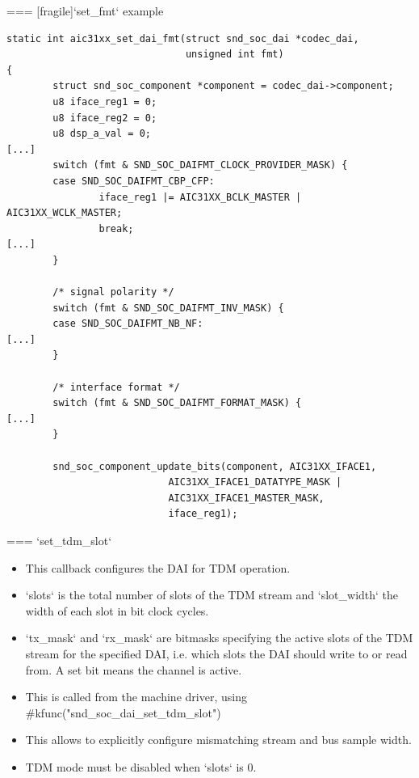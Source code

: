 === [fragile]{`set_fmt` example}
  \begin{block}{}
    \fontsize{7}{7}\selectfont
    \begin{verbatim}
static int aic31xx_set_dai_fmt(struct snd_soc_dai *codec_dai,
                               unsigned int fmt)
{
        struct snd_soc_component *component = codec_dai->component;
        u8 iface_reg1 = 0;
        u8 iface_reg2 = 0;
        u8 dsp_a_val = 0;
[...]
        switch (fmt & SND_SOC_DAIFMT_CLOCK_PROVIDER_MASK) {
        case SND_SOC_DAIFMT_CBP_CFP:
                iface_reg1 |= AIC31XX_BCLK_MASTER | AIC31XX_WCLK_MASTER;
                break;
[...]
        }

        /* signal polarity */
        switch (fmt & SND_SOC_DAIFMT_INV_MASK) {
        case SND_SOC_DAIFMT_NB_NF:
[...]
        }

        /* interface format */
        switch (fmt & SND_SOC_DAIFMT_FORMAT_MASK) {
[...]
        }

        snd_soc_component_update_bits(component, AIC31XX_IFACE1,
                            AIC31XX_IFACE1_DATATYPE_MASK |
                            AIC31XX_IFACE1_MASTER_MASK,
                            iface_reg1);
    \end{verbatim}
  \end{block}


=== {`set_tdm_slot`}
  \begin{itemize}
  \item This callback configures the DAI for TDM operation.
  \item `slots` is the total number of slots of the TDM stream and
    `slot_width` the width of each slot in bit clock cycles.
  \item `tx_mask` and `rx_mask` are bitmasks specifying the
    active slots of the TDM stream for the specified DAI, i.e. which slots the
    DAI should write to or read from. A set bit means the channel is
    active.
  \item This is called from the machine driver, using
    #kfunc("snd_soc_dai_set_tdm_slot")
  \item This allows to explicitly configure mismatching stream and bus
    sample width.
  \item TDM mode must be disabled when `slots` is 0.
  \end{itemize}


